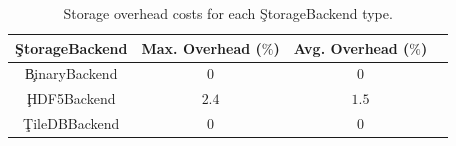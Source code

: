 \begin{table}[h!]
\centering
 \begin{tabular}{|c |c |c |c|}
  \hline
  \c{StorageBackend} & Max. Overhead ($\%$) & Avg. Overhead ($\%$) \\
  \hline
  \c{BinaryBackend} & $0$ & $0$ \\
  \hline
  \c{HDF5Backend} & $2.4$ & $1.5$ \\
  \hline
  \c{TileDBBackend} & $0$ & $0$ \\
  \hline
\end{tabular}
\caption{Storage overhead costs for each \c{StorageBackend} type.}
\label{table:storage-overhead}
\end{table}

